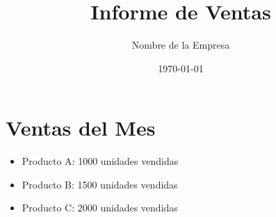 \documentclass{article}
\begin{document}
\title{Informe de Ventas}
\author{Nombre de la Empresa}
\date{\today}
\maketitle

\section{Ventas del Mes}

\begin{itemize}
    \item Producto A: 1000 unidades vendidas
    \item Producto B: 1500 unidades vendidas
    \item Producto C: 2000 unidades vendidas
\end{itemize}
\end{document}
